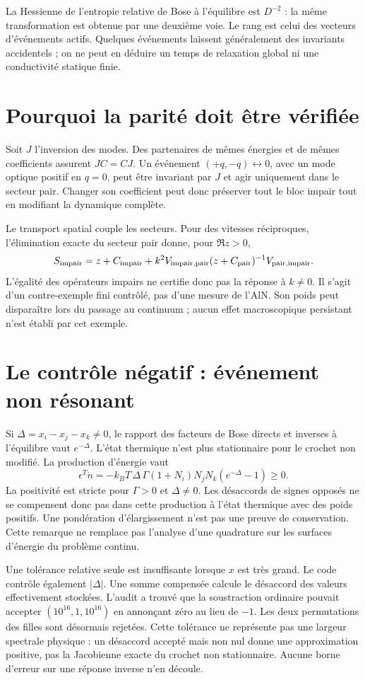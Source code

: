 \documentclass[11pt,a4paper]{article}
\begin{document}
La Hessienne de l'entropie relative de Bose à l'équilibre est
$D^{-2}$ : la même transformation est obtenue par une deuxième voie.
Le rang est celui des vecteurs d'événements actifs. Quelques événements
laissent généralement des invariants accidentels ; on ne peut en déduire
un temps de relaxation global ni une conductivité statique finie.

\section{Pourquoi la parité doit être vérifiée}
Soit $J$ l'inversion des modes. Des partenaires de mêmes énergies
et de mêmes coefficients assurent $JC=CJ$. Un événement
$(+q,-q)\leftrightarrow0$, avec un mode optique positif en $q=0$,
peut être invariant par $J$ et agir uniquement dans le secteur pair.
Changer son coefficient peut donc préserver tout le bloc impair tout
en modifiant la dynamique complète.

Le transport spatial couple les secteurs. Pour des vitesses réciproques,
l'élimination exacte du secteur pair donne, pour $\Re z>0$,
\[
 S_{\rm impair}=z+C_{\rm impair}
  +k^2V_{\rm impair,pair}(z+C_{\rm pair})^{-1}V_{\rm pair,impair}.
\]
L'égalité des opérateurs impairs ne certifie donc pas la réponse à $k\ne0$.
Il s'agit d'un contre-exemple fini contrôlé, pas d'une mesure de l'AlN.
Son poids peut disparaître lors du passage au continuum ; aucun effet
macroscopique persistant n'est établi par cet exemple.

\section{Le contrôle négatif : événement non résonant}
Si $\Delta=x_i-x_j-x_k\ne0$, le rapport des facteurs de Bose directs et
inverses à l'équilibre vaut $e^{-\Delta}$. L'état thermique n'est plus
stationnaire pour le crochet non modifié. La production d'énergie vaut
\[
 \epsilon^T\dot n
 =-k_BT\,\Delta\,\Gamma(1+N_i)N_jN_k(e^{-\Delta}-1)\ge0 .
\]
La positivité est stricte pour $\Gamma>0$ et $\Delta\ne0$.
Les désaccords de signes opposés ne se compensent donc pas dans cette
production à l'état thermique avec des poids positifs.
Une pondération d'élargissement n'est pas une preuve de conservation.
Cette remarque ne remplace pas l'analyse d'une quadrature sur les surfaces
d'énergie du problème continu.

Une tolérance relative seule est insuffisante lorsque $x$ est très grand.
Le code contrôle également $|\Delta|$. Une somme compensée calcule le désaccord des valeurs effectivement
stockées. L'audit a trouvé que la soustraction ordinaire pouvait accepter
$(10^{16},1,10^{16})$ en annonçant zéro au lieu de $-1$.
Les deux permutations des filles sont désormais rejetées.
Cette tolérance ne représente pas une largeur spectrale physique :
un désaccord accepté mais non nul donne une approximation positive,
pas la Jacobienne exacte du crochet non stationnaire.
Aucune borne d'erreur sur une réponse inverse n'en découle.
\end{document}
